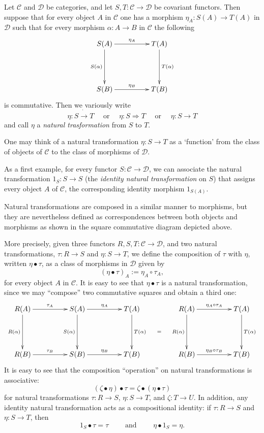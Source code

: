 Let $\mathcal{C}$ and $\mathcal{D}$ be categories, and let 
$S,T:\mathcal{C}\to\mathcal{D}$ be covariant functors. Then suppose
that for every object $A$ in $\mathcal{C}$ one has a morphism 
$\eta_A :  S(A) \to T(A) $ in $\mathcal{D}$ such that for every morphism 
$\alpha: A \to B$ in $\mathcal{C}$ the following
$$
\xymatrix@+=4pc{S(A) \ar[d]_{S(\alpha)} \ar[r]^{\eta_A} & T(A) \ar[d]^{T(\alpha)} \\
S(B) \ar[r]^{\eta_{B}} & T(B)
}
$$
is commutative.  Then we variously write 
$$
\eta: S \dot{\to} T \quad\mbox{ or }\quad \eta: S\Rightarrow T\quad \mbox{ or } \quad \eta:S\to T
$$
and call $\eta$ a \emph{natural trasformation} from $S$ to $T$.

One may think of a natural transformation $\eta:S\to T$ as a `function' from the class of objects of $\mathcal{C}$ to the class of morphisms of $\mathcal{D}$.

As a first example, for every functor $S:\mathcal{C}\to \mathcal{D}$, we can associate the natural transformation $1_S: S\to S$ (the \emph{identity natural transformation} on $S$) that assigns every object $A$ of $\mathcal{C}$, the corresponding identity morphism $1_{S(A)}$.

Natural transformations are composed in a similar manner to morphisms, but they are nevertheless defined as correspondences between both objects and morphisms as shown in the square commutative diagram depicted above. 

More precisely, given three functors $R,S,T:\mathcal{C}\to \mathcal{D}$, and two natural transformations, $\tau:R\to S$ and $\eta:S\to T$, we define the composition of $\tau$ with $\eta$, written $\eta \bullet \tau$, as a class of morphisms in $\mathcal{D}$ given by 
$$(\eta\bullet \tau)_A := \eta_A\circ \tau_A,$$ for every object $A$ in $\mathcal{C}$.
It is easy to see that $\eta\bullet \tau$ is a natural transformation, since we may ``compose'' two commutative squares and obtain a third one:
$$
\xymatrix@+=4pc{R(A) \ar[d]_{R(\alpha)} \ar[r]^{\tau_A}  & S(A) \ar[d]_{S(\alpha)} \ar[r]^{\eta_A} & T(A) \ar[d]^{T(\alpha)} \ar@{}[dr]|{=} &  
R(A) \ar[d]_{R(\alpha)} \ar[r]^{\eta_A \circ \tau_A} & T(A) \ar[d]^{T(\alpha)} 
\\
R(B) \ar[r]^{\tau_{B}} & S(B) \ar[r]^{\eta_{B}} & T(B) & 
R(B) \ar[r]^{\eta_B \circ \tau_B} & T(B)
}
$$
It is easy to see that the composition ``operation'' on natural transformations is associative:
$$(\zeta\bullet \eta)\bullet \tau = \zeta\bullet (\eta \bullet \tau)$$
for natural transformations $\tau:R\to S$, $\eta:S\to T$, and $\zeta:T\to U$.  In addition, any identity natural transformation acts as a compositional identity: if $\tau:R\to S$ and $\eta:S\to T$, then $$1_S\bullet \tau=\tau \qquad\mbox{ and }\qquad \eta \bullet 1_S = \eta.$$
